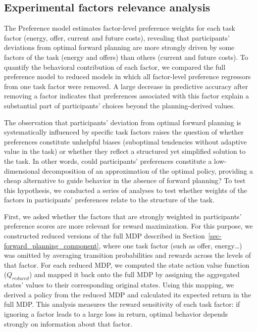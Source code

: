 \documentclass[
  letterpaper,
  DIV=11,
  numbers=noendperiod]{scrartcl}
\begin{document}
\subsection{Experimental factors relevance
analysis}\label{sec-factor-relevance-analysis}

The Preference model estimates factor-level preference weights for each
task factor (energy, offer, current and future costs), revealing that
participants' deviations from optimal forward planning are more strongly
driven by some factors of the task (energy and offers) than others
(current and future costs). To quantify the behavioral contribution of
each factor, we compared the full preference model to reduced models in
which all factor-level preference regressors from one task factor were
removed. A large decrease in predictive accuracy after removing a factor
indicates that preferences associated with this factor explain a
substantial part of participants' choices beyond the planning-derived
values.

The observation that participants' deviation from optimal forward
planning is systematically influenced by specific task factors raises
the question of whether preferences constitute unhelpful biases
(suboptimal tendencies without adaptive value in the task) or whether
they reflect a structured yet simplified solution to the task. In other
words, could participants' preferences constitute a low-dimensional
decomposition of an approximation of the optimal policy, providing a
cheap alternative to guide behavior in the absence of forward planning?
To test this hypothesis, we conducted a series of analyses to test
whether weights of the factors in participants' preferences relate to
the structure of the task.

First, we asked whether the factors that are strongly weighted in
participants' preference scores are more relevant for reward
maximization. For this purpose, we constructed reduced versions of the
full MDP described in Section~\ref{sec-forward_planning_component},
where one task factor (such as offer, energy\ldots) was omitted by
averaging transition probabilities and rewards across the levels of that
factor. For each reduced MDP, we computed the state action value
function (\(Q_{reduced}\)) and mapped it back onto the full MDP by
assigning the aggregated states' values to their corresponding original
states. Using this mapping, we derived a policy from the reduced MDP and
calculated its expected return in the full MDP. This analysis measures
the reward sensitivity of each task factor: if ignoring a factor leads
to a large loss in return, optimal behavior depends strongly on
information about that factor.
\end{document}
